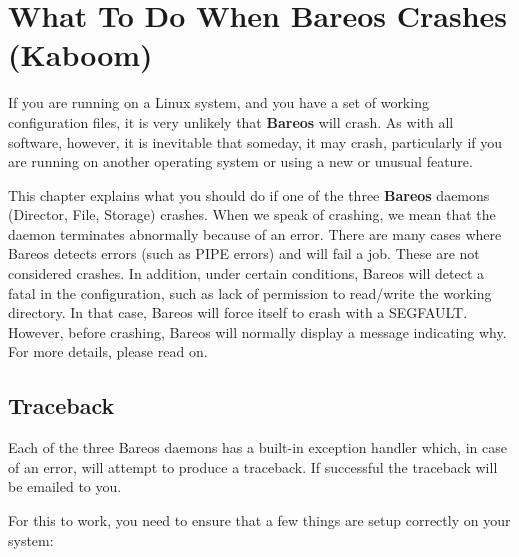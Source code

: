 
\chapter{What To Do When Bareos Crashes (Kaboom)}
\label{KaboomChapter}

If you are running on a Linux system, and you have a set of working
configuration files, it is very unlikely that {\bf Bareos} will crash. As with
all software, however, it is inevitable that someday, it may crash,
particularly if you are running on another operating system or using a new or
unusual feature.

This chapter explains what you should do if one of the three {\bf Bareos}
daemons (Director, File, Storage) crashes.  When we speak of crashing, we
mean that the daemon terminates abnormally because of an error.  There are
many cases where Bareos detects errors (such as PIPE errors) and will fail
a job. These are not considered crashes.  In addition, under certain
conditions, Bareos will detect a fatal in the configuration, such as
lack of permission to read/write the working directory. In that case,
Bareos will force itself to crash with a SEGFAULT. However, before
crashing, Bareos will normally display a message indicating why.
For more details, please read on.


\section{Traceback}

Each of the three Bareos daemons has a built-in exception handler which, in
case of an error, will attempt to produce a traceback. If successful the
traceback will be emailed to you.

For this to work, you need to ensure that a few things are setup correctly on
your system:

